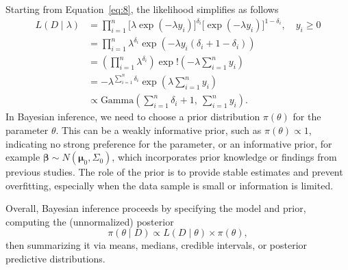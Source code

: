 Starting from Equation~\eqref{eq:8}, the likelihood simplifies as follows
\begin{align}
L(D \mid \lambda)
&=\prod_{i=1}^{n}
\big[\lambda \exp(-\lambda y_i)\big]^{\delta_i}
\big[\exp(-\lambda y_i)\big]^{1-\delta_i}, \quad y_i \ge 0 \\
&=
\prod_{i=1}^{n}
\lambda^{\delta_i}
\exp\left(
-\lambda y_i (\delta_i + 1 - \delta_i)
\right) \\
&=
\left(
\prod_{i=1}^{n}
\lambda^{\delta_i}
\right)
\exp!\left(
-\lambda \sum_{i=1}^{n} y_i
\right)\\
&=
-\lambda^{\sum_{i=1}^{n} \delta_i}
\exp\left(
\lambda \sum_{i=1}^{n} y_i
\right)\\
&\propto
\text{Gamma}
\left(
\sum_{i=1}^{n} \delta_i + 1,\ \sum_{i=1}^{n} y_i
\right).
\end{align}
In Bayesian inference, we need to choose a prior distribution $\pi(\theta)$ for the parameter $\theta$. This can be a weakly informative prior, such as $\pi(\theta) \propto 1$, indicating no strong preference for the parameter, or an informative prior, for example $\boldsymbol{\beta} \sim N(\boldsymbol{\mu}_0, \Sigma_0)$, which incorporates prior knowledge or findings from previous studies. The role of the prior is to provide stable estimates and prevent overfitting, especially when the data sample is small or information is limited.

Overall, Bayesian inference proceeds by specifying the model and prior, computing the (unnormalized) posterior
\begin{equation}
\pi(\theta \mid D)
\propto
L(D \mid \theta)\times \pi(\theta),
\end{equation}
then summarizing it via means, medians, credible intervals, or posterior predictive distributions.

